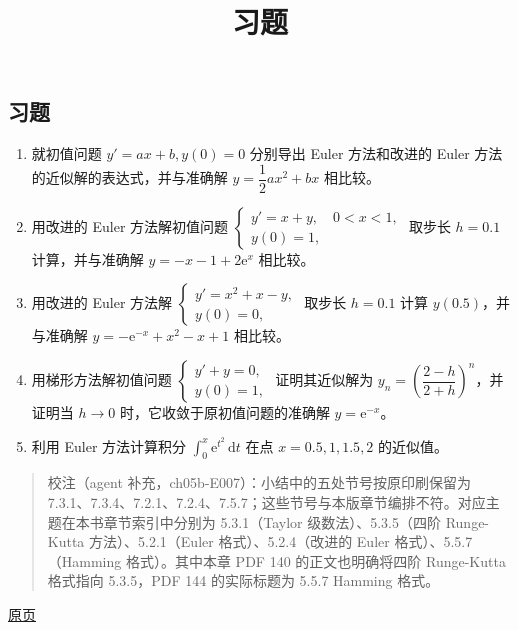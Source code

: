 \documentclass[
  10pt,
  fontset=fandol]{ctexart}
\title{习题}
\author{}
\date{}
\begin{document}
\maketitle

\subsection{习题}\label{ux4e60ux9898}

\begin{enumerate}
\def\labelenumi{\arabic{enumi}.}
\item
  就初值问题 \(y'=ax+b,y(0)=0\) 分别导出 Euler 方法和改进的 Euler 方法的近似解的表达式，并与准确解 \(y=\dfrac12ax^2+bx\) 相比较。
\item
  用改进的 Euler 方法解初值问题 \(\begin{cases}y'=x+y,\quad0<x<1,\\y(0)=1,\end{cases}\) 取步长 \(h=0.1\) 计算，并与准确解 \(y=-x-1+2\mathrm e^x\) 相比较。
\item
  用改进的 Euler 方法解 \(\begin{cases}y'=x^2+x-y,\\y(0)=0,\end{cases}\) 取步长 \(h=0.1\) 计算 \(y(0.5)\)，并与准确解 \(y=-\mathrm e^{-x}+x^2-x+1\) 相比较。
\item
  用梯形方法解初值问题 \(\begin{cases}y'+y=0,\\y(0)=1,\end{cases}\) 证明其近似解为 \(y_n=\left(\dfrac{2-h}{2+h}\right)^n\)，并证明当 \(h\to0\) 时，它收敛于原初值问题的准确解 \(y=\mathrm e^{-x}\)。
\item
  利用 Euler 方法计算积分 \(\displaystyle\int_0^x\mathrm e^{t^2}\,\mathrm dt\) 在点 \(x=0.5,1,1.5,2\) 的近似值。
\end{enumerate}

\begin{quote}
校注（agent 补充，ch05b-E007）：小结中的五处节号按原印刷保留为 7.3.1、7.3.4、7.2.1、7.2.4、7.5.7；这些节号与本版章节编排不符。对应主题在本书章节索引中分别为 5.3.1（Taylor 级数法）、5.3.5（四阶 Runge-Kutta 方法）、5.2.1（Euler 格式）、5.2.4（改进的 Euler 格式）、5.5.7（Hamming 格式）。其中本章 PDF 140 的正文也明确将四阶 Runge-Kutta 格式指向 5.3.5，PDF 144 的实际标题为 5.5.7 Hamming 格式。
\end{quote}

\href{../../source-images/pdf-154.jpeg}{原页}
\end{document}

